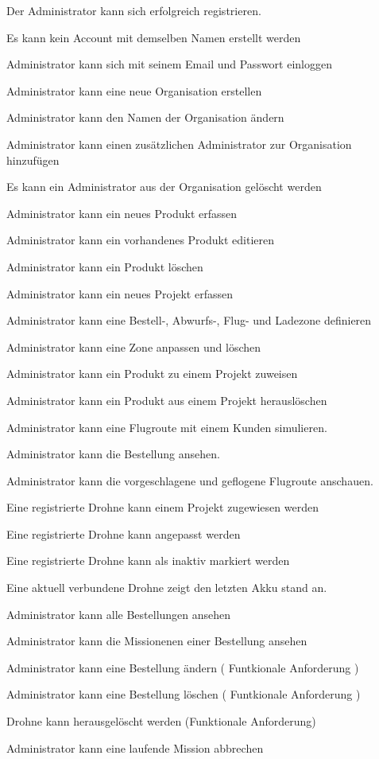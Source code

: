 \begin{todolist}
	\item[\done] Der Administrator kann sich erfolgreich registrieren.
	\item Es kann kein Account mit demselben Namen erstellt werden
	\item[\done] Administrator kann sich mit seinem Email und Passwort einloggen
	\item[\done] Administrator kann eine neue Organisation erstellen
	\item[\done] Administrator kann den Namen der Organisation ändern
	\item Administrator kann einen zusätzlichen Administrator zur Organisation hinzufügen
	\item Es kann ein Administrator aus der Organisation gelöscht werden
	\item[\done] Administrator kann ein neues Produkt erfassen
	\item[\done] Administrator kann ein vorhandenes Produkt editieren
	\item[\done] Administrator kann ein Produkt löschen
	\item[\done] Administrator kann ein neues Projekt erfassen
	\item Administrator kann eine Bestell-, Abwurfs-, Flug- und Ladezone definieren
	\item Administrator kann eine Zone anpassen und löschen
	\item Administrator kann ein Produkt zu einem Projekt zuweisen
	\item Administrator kann ein Produkt aus einem Projekt herauslöschen
	\item Administrator kann eine Flugroute mit einem Kunden simulieren.
	
	\item Administrator kann die Bestellung ansehen.
	\item Administrator kann die vorgeschlagene und geflogene Flugroute anschauen.
	
	\item[\done] Eine registrierte Drohne kann einem Projekt zugewiesen werden
	\item Eine registrierte Drohne kann angepasst werden
	\item Eine registrierte Drohne kann als inaktiv markiert werden
	\item Eine aktuell verbundene Drohne zeigt den letzten Akku stand an.
	\item Administrator kann alle Bestellungen ansehen
	\item Administrator kann die Missionenen einer Bestellung ansehen
	
	\item Administrator kann eine Bestellung ändern ( Funtkionale Anforderung )
	\item Administrator kann eine Bestellung löschen ( Funtkionale Anforderung )
	\item Drohne kann herausgelöscht werden (Funktionale Anforderung) 
	
	\item Administrator kann eine laufende Mission abbrechen 
\end{todolist}

